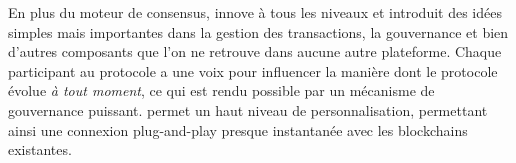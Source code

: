 \documentclass[runningheads,francais,a4paper]{llncs}
\begin{document}
En plus du moteur de consensus, \AVAPlatformName{} innove à tous les niveaux et introduit des idées simples mais
importantes dans la gestion des transactions, la gouvernance et bien d'autres composants que l'on ne retrouve dans
aucune autre plateforme. Chaque participant au protocole a une voix pour influencer la manière dont le
protocole évolue \emph{à tout moment}, ce qui est rendu possible par un mécanisme de gouvernance puissant. \AVAPlatformName{}
permet un haut niveau de personnalisation, permettant ainsi une connexion plug-and-play presque instantanée avec les blockchains
existantes.



\end{document}

